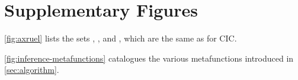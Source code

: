 \section{Supplementary Figures}\label{sec:supplementary}


\autoref{fig:axruel} lists the sets \Axioms, \Rules, and \Elims, which are the same as for CIC.

\autoref{fig:inference-metafunctions} catalogues the various metafunctions introduced in \autoref{sec:algorithm}.
